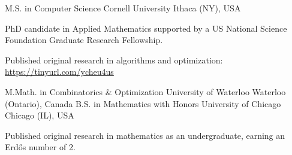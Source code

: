 

\begin{cventries}

  \cventry
    {M.S. in Computer Science} %
    {Cornell University} %
    {Ithaca (NY), USA} %
    {} %
    {
      \begin{cvitems} %
        \item {PhD candidate in Applied Mathematics supported by a US National Science Foundation Graduate Research Fellowship.}
        \item {Published original research in algorithms and optimization: \url{https://tinyurl.com/ycheu4us}}
      \end{cvitems}
    }

  \cventry
    {M.Math. in Combinatorics \& Optimization} %
    {University of Waterloo} %
    {Waterloo (Ontario), Canada} %
    {} %
    {}
  \vspace{-1.0mm}
  \cventry
    {B.S. in Mathematics with Honors} %
    {University of Chicago} %
    {Chicago (IL), USA} %
    {} %
    {
      \begin{cvitems} %
        \item {Published original research in mathematics as an undergraduate, earning an Erd\H{o}s number of 2.}
      \end{cvitems}
    }
  \vspace{-1.0mm}
\end{cventries}
